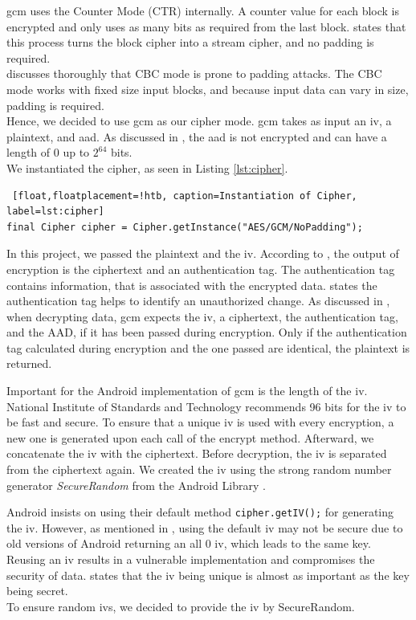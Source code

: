 \gls{gcm} uses the Counter Mode (CTR) internally. A counter value for each block is encrypted and only uses as many bits as required from the last block. \cite{AESJavaAndroid} states that this process turns the block cipher into a stream cipher, and no padding is required. \\
\cite{fedler2013padding} discusses thoroughly that CBC mode is prone to padding attacks. The CBC mode works with fixed size input blocks, and because input data can vary in size, padding is required. \\
Hence, we decided to use \gls{gcm} as our cipher mode. \gls{gcm} takes as input an \gls{iv}, a plaintext, and \gls{aad}. As discussed in \cite{mcgrew2004galois}, the \gls{aad} is not encrypted and can have a length of $0$ up to $2^{64}$ bits. \\
We instantiated the cipher, as seen in Listing \ref{lst:cipher}.

\begin{lstlisting} [float,floatplacement=!htb, caption=Instantiation of Cipher, label=lst:cipher]
final Cipher cipher = Cipher.getInstance("AES/GCM/NoPadding");
\end{lstlisting}

In this project, we passed the plaintext and the \gls{iv}. According to \cite{dworkin2007sp}, the output of encryption is the ciphertext and an authentication tag. The authentication tag contains information, that is associated with the encrypted data. \cite{AESJavaAndroid} states the authentication tag helps to identify an unauthorized change. As discussed in \cite{dworkin2007sp}, when decrypting data, \gls{gcm} expects the \gls{iv}, a ciphertext, the authentication tag, and the AAD, if it has been passed during encryption. Only if the authentication tag calculated during encryption and the one passed are identical, the plaintext is returned.

Important for the Android implementation of \gls{gcm} is the length of the \gls{iv}. National Institute of Standards and Technology \cite{dworkin2007sp} recommends 96 bits for the \gls{iv} to be fast and secure. To ensure that a unique \gls{iv} is used with every encryption, a new one is generated upon each call of the encrypt method. Afterward, we concatenate the \gls{iv} with the ciphertext. Before decryption, the \gls{iv} is separated from the ciphertext again. We created the \gls{iv} using the strong random number generator \textit{SecureRandom} from the Android Library \cite{SecureRandom}.

Android insists on using their default method \texttt{cipher.getIV();} for generating the \gls{iv}. However, as mentioned in \cite{DefaultIV}, using the default \gls{iv} may not be secure due to old versions of Android returning an all $0$ \gls{iv}, which leads to the same key. Reusing an \gls{iv} results in a vulnerable implementation and compromises the security of data. \cite{dworkin2007sp} states that the \gls{iv} being unique is almost as important as the key being secret. \\
To ensure random \glspl{iv}, we decided to provide the \gls{iv} by SecureRandom. 

